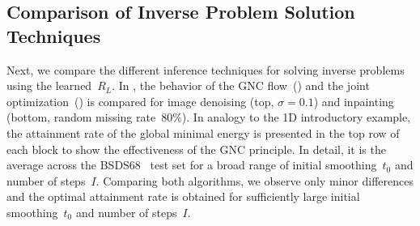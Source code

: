 \documentclass{article}
\theoremstyle{plain}
\theoremstyle{definition}
\theoremstyle{remark}
\begin{document}
\subsection{Comparison of Inverse Problem Solution Techniques}
Next, we compare the different inference techniques for solving inverse problems using the learned~$R_L$.
In , the behavior of the GNC flow~() and the joint optimization~() is compared for image denoising (top, $\sigma=0.1$) and inpainting (bottom, random missing rate~$80\%$).
In analogy to the 1D introductory example, the attainment rate of the global minimal energy is presented in the top row of each block to show the effectiveness of the GNC principle.
In detail, it is the average across the BSDS68~\cite{MaFo01} test set for a broad range of initial smoothing~$t_0$ and number of steps~$I$.
Comparing both algorithms, we observe only minor differences and the optimal attainment rate is obtained for sufficiently large initial smoothing~$t_0$ and number of steps~$I$.
\end{document}
